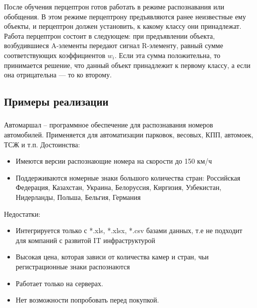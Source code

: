 После обучения перцептрон готов работать в режиме распознавания или обобщения. В этом режиме перцептрону предъявляются ранее неизвестные ему объекты, и перцептрон должен установить, к какому классу они принадлежат. Работа перцептрон состоит в следующем: при предъявлении объекта, возбудившиеся A-элементы передают сигнал R-элементу, равный сумме соответствующих коэффициентов $w_i$. Если эта сумма положительна, то принимается решение, что данный объект принадлежит к первому классу, а если она отрицательна — то ко второму.

\subsection{Примеры реализации}
\label{sub:domain:realization}

\subsubsection{}
\label{sub:domain:realization:automarshal}
Автомаршал – программное обеспечение для распознавания номеров автомобилей. Применяется для автоматизации парковок, весовых, КПП, автомоек, ТСЖ и т.п.\cite{auto_marshal}
Достоинства:
\begin{itemize}
  \item Имеются версии распознающие номера на скорости до 150 км/ч
  \item Поддерживаются номерные знаки большого количества стран: Российская Федерация, Казахстан, Украина, Белоруссия, Киргизия, Узбекистан, Нидерланды, Польша, Бельгия, Германия
\end{itemize}
Недостатки:
\begin{itemize}
  \item Интегрируется только с *.xls, *.xlsx, *.csv базами данных, т.е не подходит для компаний с развитой IT инфраструктурой
  \item Высокая цена, которая зависи от количества камер и стран, чьи регистрационные знаки распознаются
  \item Работает только на \windows{} серверах.
  \item Нет возможности попробовать перед покупкой.
\end{itemize}

